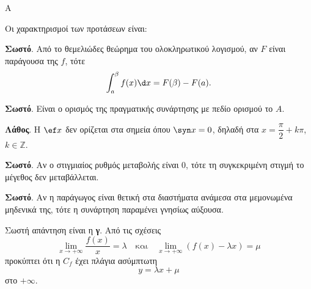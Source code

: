 \begin{thema}{Α}
\begin{erwthma}
\item {}

\item {}

\item {}

\item Οι χαρακτηρισμοί των προτάσεων είναι:
\begin{alist}
\item \textbf{Σωστό}. Από το θεμελιώδες θεώρημα του ολοκληρωτικού λογισμού, αν $F$ είναι παράγουσα της $f$, τότε
\[ \dint_a^\beta f(x)\d x=F(\beta)-F(a). \]
\item \textbf{Σωστό}. Είναι ο ορισμός της πραγματικής συνάρτησης με πεδίο ορισμού το $A$.
\item \textbf{Λάθος}. Η $\ef x$ δεν ορίζεται στα σημεία όπου $\syn x=0$, δηλαδή στα $x=\dfrac{\pi}{2}+k\pi$, $k\in\mathbb{Z}$.
\item \textbf{Σωστό}. Αν ο στιγμιαίος ρυθμός μεταβολής είναι $0$, τότε τη συγκεκριμένη στιγμή το μέγεθος δεν μεταβάλλεται.
\item \textbf{Σωστό}. Αν η παράγωγος είναι θετική στα διαστήματα ανάμεσα στα μεμονωμένα μηδενικά της, τότε η συνάρτηση παραμένει γνησίως αύξουσα.
\end{alist}

\item Σωστή απάντηση είναι η \textbf{γ}. Από τις σχέσεις
\[ \lim_{x\to+\infty}\dfrac{f(x)}{x}=\lambda
\quad\text{και}\quad
\lim_{x\to+\infty}(f(x)-\lambda x)=\mu \]
προκύπτει ότι η $C_f$ έχει πλάγια ασύμπτωτη
\[ y=\lambda x+\mu \]
στο $+\infty$.
\end{erwthma}
\end{thema}

